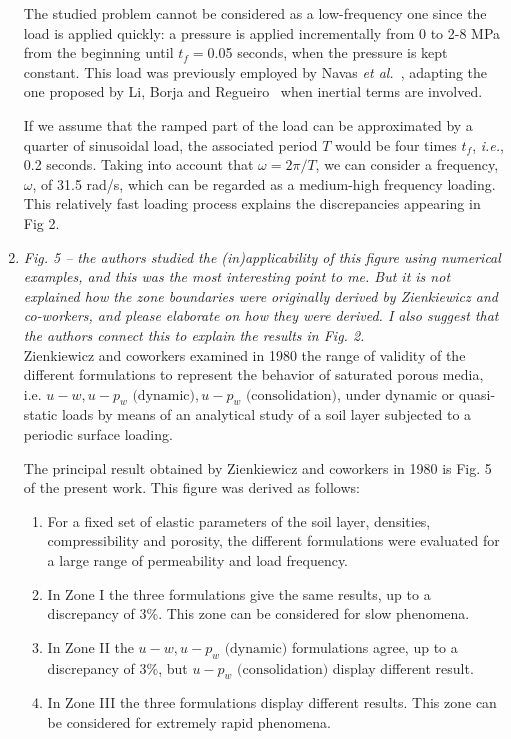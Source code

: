 \documentclass[12pt]{article}
\begin{document}
\begin{enumerate}
The studied problem cannot be considered as a low-frequency one since the load is applied quickly: a pressure is applied incrementally from 0 to 2-8 MPa from the beginning until $t_f=$0.05 seconds, when the pressure is kept constant. This load was previously employed by Navas \textit{et al.}~\cite{Navas:17b,Navas:17c}, adapting the one proposed by Li, Borja and Regueiro~\cite{LiBorja2004} when inertial terms are involved.

If we assume that the ramped part of the load can be approximated by a quarter of sinusoidal load, the associated period $T$ would be four times $t_f$, \textit{i.e.}, 0.2 seconds. Taking into account that $\omega=2\pi/T$, we can consider a frequency, $\omega$, of 31.5 rad/s, which can be regarded as a medium-high frequency loading. This relatively fast loading process explains the discrepancies appearing in Fig 2.

\item \textit{Fig. 5 -- the authors studied the (in)applicability of this figure using numerical examples, and this was the most interesting point to me. But it is not explained how the zone boundaries were originally derived by Zienkiewicz and co-workers, and please elaborate on how they were derived. I also suggest that the authors connect this to explain the results in Fig. 2. }\\

Zienkiewicz and coworkers examined in 1980 the range of validity of the different formulations to represent the behavior of saturated porous media, i.e. $u-w, u-p_w \text{ (dynamic)}, u-p_w \text{ (consolidation)}$,  under dynamic or quasi-static loads by means of an analytical study of a soil layer subjected to a periodic surface loading. 

The principal result obtained by Zienkiewicz and coworkers in 1980 is Fig. 5 of the present work. This figure was derived as follows: 

\begin{enumerate}
    \item For a fixed set of elastic parameters of the soil layer, densities, compressibility and porosity, the different formulations were evaluated for a large range of permeability and load frequency.
    \item In Zone I the three formulations give the same results, up to a discrepancy of $3\%$. This zone can be considered for slow phenomena.
    \item In Zone II the $u-w, u-p_w \text{ (dynamic)}$ formulations agree, up to a discrepancy of $3\%$, but $u-p_w \text{ (consolidation)}$ display different result.
    \item In Zone III the three formulations display different results. This zone can be considered for extremely rapid phenomena. 
\end{enumerate}


\end{enumerate}
\end{document}

